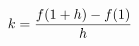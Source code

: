 \documentclass[preview]{standalone}
\begin{document}
\begin{align*}
\special{dvisvgm:raw <g id='unique000'>}k = \frac{f(1+h)-f(1)}{h}\special{dvisvgm:raw </g>}
\end{align*}
\end{document}
